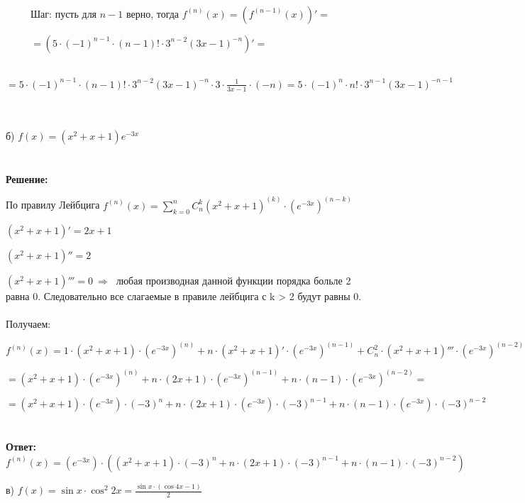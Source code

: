 \documentclass[12pt]{article}
\begin{document}
    \\
    \par \ \ \ \ \ Шаг: пусть для $n - 1$ верно, тогда $f^{(n)}(x) = (f^{(n - 1)}(x))' = 
    $\par \ \ \ \ \ $ = (5 \cdot (-1)^{n - 1} \cdot (n - 1)! \cdot 3^{n - 2}(3x - 1)^{-n})' =
    $\par \ \ \ \ \ $ = 5 \cdot (-1)^{n - 1} \cdot (n - 1)! \cdot 3^{n - 2}(3x - 1)^{-n} \cdot 3 \cdot \frac{1}{3x - 1} \cdot (-n) = 5 \cdot (-1)^{n} \cdot n! \cdot 3^{n - 1}(3x - 1)^{-n - 1}$
    \\
    \\
    \\
    \par б) $f(x) = (x^2 + x + 1)e^{-3x}$\\
    \\
    \\ \textbf{Решение: }
    \par По правилу Лейбцига $f^{(n)}(x) = \sum_{k=0}^{n} C_{n}^{k} (x^2 + x + 1)^{(k)} \cdot (e^{-3x})^{(n - k)}$
    \\
    \par $(x^2 + x + 1)' = 2x + 1$
    \par $(x^2 + x + 1)'' = 2$
    \par $(x^2 + x + 1)''' = 0 \ \Rightarrow \ $  любая производная данной функции порядка больле 2 равна 0. Следовательно все слагаемые в правиле лейбцига с k > 2 будут равны 0.
    \\
    \\ Получаем: 
    \par $f^{(n)}(x) = 1 \cdot (x^2 + x + 1) \cdot (e^{-3x})^{(n)} + n \cdot (x^2 + x + 1)' \cdot (e^{-3x})^{(n - 1)} + C_n^{2} \cdot (x^2 + x + 1)''' \cdot (e^{-3x})^{(n - 2)} = $
    \par $ = (x^2 + x + 1) \cdot (e^{-3x})^{(n)} + n \cdot (2x + 1) \cdot (e^{-3x})^{(n - 1)} + n \cdot (n - 1) \cdot (e^{-3x})^{(n - 2)} = $
    \par $ = (x^2 + x + 1) \cdot (e^{-3x})\cdot(-3)^{n} + n \cdot (2x + 1) \cdot (e^{-3x})\cdot(-3)^{n - 1} + n \cdot (n - 1) \cdot (e^{-3x})\cdot(-3)^{n - 2}$
    \\
    \\
    \\ \textbf{Ответ: } $f^{(n)}(x) = (e^{-3x}) \cdot ((x^2 + x + 1) \cdot(-3)^{n} + n \cdot (2x + 1) \cdot(-3)^{n - 1} + n \cdot (n - 1) \cdot(-3)^{n - 2})$
    \\
    \par в) $f(x) = \sin{x}\cdot \cos^2{2x} = \frac{\sin{x}\cdot (\cos{4x} - 1)}{2}$\\\\
\end{document}
